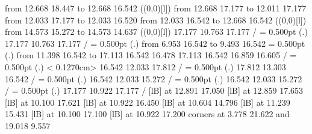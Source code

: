 {\putrule from 12.668 18.447 to 12.668 16.542
%
%
\linethickness=1pt
\setplotsymbol ({\makebox(0,0)[l]{\tencirc{}}})
\putrule from 12.668 17.177 to 12.011 17.177
\putrule from 12.033 17.177 to 12.033 16.520
\putrule from 12.033 16.542 to 12.668 16.542
%
%
\linethickness=1pt
\setplotsymbol ({\makebox(0,0)[l]{\tencirc{}}})
\putrule from 14.573 15.272 to 14.573 14.637
%
%
\linethickness=1pt
\setplotsymbol ({\makebox(0,0)[l]{\tencirc{}}})
 17.177 10.763 17.177 /
%
%
\linethickness= 0.500pt
\setplotsymbol ({\thinlinefont .})
 17.177 10.763 17.177 /
%
%
\linethickness= 0.500pt
\setplotsymbol ({\thinlinefont .})
\putrule from  6.953 16.542 to  9.493 16.542
%
%
\linethickness= 0.500pt
\setplotsymbol ({\thinlinefont .})
\putrule from 11.398 16.542 to 17.113 16.542
%
%
 16.478 17.113 16.542 16.859 16.605 /
%
%
%
\linethickness= 0.500pt
\setplotsymbol ({\thinlinefont .})
\setdashes < 0.1270cm>
 16.542 12.033 17.812 /
%
%
\linethickness= 0.500pt
\setplotsymbol ({\thinlinefont .})
 17.812 13.303 16.542 /
%
%
\linethickness= 0.500pt
\setplotsymbol ({\thinlinefont .})
 16.542 12.033 15.272 /
%
%
\linethickness= 0.500pt
\setplotsymbol ({\thinlinefont .})
 16.542 12.033 15.272 /
%
%
\linethickness= 0.500pt
\setplotsymbol ({\thinlinefont .})
 17.177 10.922 17.177 /
%
%
 [lB] at 12.891 17.050
%
%
 [lB] at 12.859 17.653
%
%
 [lB] at 10.100 17.621
%
%
 [lB] at 10.922 16.450
%
%
 [lB] at 10.604 14.796
%
%
 [lB] at 11.239 15.431
%
%
 [lB] at 10.100 17.100
%
%
 [lB] at 10.922 17.200
\linethickness=0pt
\putrectangle corners at  3.778 21.622 and 19.018  9.557
\endpicture}
